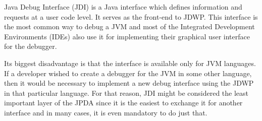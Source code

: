 \documentclass[..thesis.tex]{subfiles}
\begin{document}
Java Debug Interface (JDI) is a Java interface which defines information and requests at a user code level.
It serves as the front-end to JDWP.
This interface is the most common way to debug a JVM and most of the Integrated Development Environments (IDEs) also use it for implementing their graphical user interface for the debugger.

Its biggest disadvantage is that the interface is available only for JVM languages.
If a developer wished to create a debugger for the JVM in some other language, then it would be necessary to implement a new debug interface using the JDWP in that particular language.
For that reason, JDI might be considered the least important layer of the JPDA since it is the easiest to exchange it for another interface and in many cases, it is even mandatory to do just that.
\end{document}

